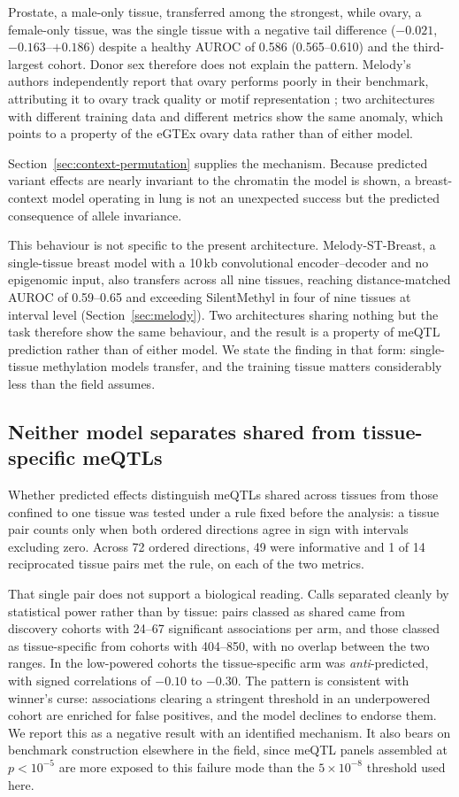 \documentclass[10pt,letterpaper,twocolumn]{article}
\begin{document}
Prostate, a male-only tissue, transferred among the strongest, while ovary, a
female-only tissue, was the single tissue with a negative tail difference
($-0.021$, $-0.163$--$+0.186$) despite a healthy AUROC of 0.586
(0.565--0.610) and the third-largest cohort. Donor sex therefore does not
explain the pattern. Melody's authors independently report that ovary performs
poorly in their benchmark, attributing it to ovary track quality or motif
representation \cite{jin2026melody}; two architectures with different training
data and different metrics show the same anomaly, which points to a property of
the eGTEx ovary data rather than of either model.

Section~\ref{sec:context-permutation} supplies the mechanism. Because predicted
variant effects are nearly invariant to the chromatin the model is shown, a
breast-context model operating in lung is not an unexpected success but the
predicted consequence of allele invariance.

This behaviour is not specific to the present architecture. Melody-ST-Breast, a
single-tissue breast model with a 10\,kb convolutional encoder--decoder and no
epigenomic input, also transfers across all nine tissues, reaching
distance-matched AUROC of 0.59--0.65 and exceeding SilentMethyl in four of nine
tissues at interval level (Section~\ref{sec:melody}). Two architectures sharing
nothing but the task therefore show the same behaviour, and the result is a
property of meQTL prediction rather than of either model. We state the finding in
that form: single-tissue methylation models transfer, and the training tissue
matters considerably less than the field assumes.

\subsection{Neither model separates shared from tissue-specific meQTLs}
\label{sec:tissue-specificity}

Whether predicted effects distinguish meQTLs shared across tissues from those
confined to one tissue was tested under a rule fixed before the analysis: a
tissue pair counts only when both ordered directions agree in sign with
intervals excluding zero. Across 72 ordered directions, 49 were informative and
1 of 14 reciprocated tissue pairs met the rule, on each of the two metrics.

That single pair does not support a biological reading. Calls separated cleanly
by statistical power rather than by tissue: pairs classed as shared came from
discovery cohorts with 24--67 significant associations per arm, and those classed
as tissue-specific from cohorts with 404--850, with no overlap between the two
ranges. In the low-powered cohorts the tissue-specific arm was
\emph{anti}-predicted, with signed correlations of $-0.10$ to $-0.30$. The
pattern is consistent with winner's curse: associations clearing a stringent
threshold in an underpowered cohort are enriched for false positives, and the
model declines to endorse them. We report this as a negative result with an
identified mechanism. It also bears on benchmark construction elsewhere in the
field, since meQTL panels assembled at $p<10^{-5}$ are more exposed to this
failure mode than the $5\times10^{-8}$ threshold used here.
\end{document}
